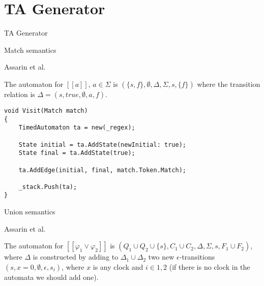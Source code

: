 
\section{TA Generator}
\begin{frame}[shrink=5]{TA Generator}
    \begin{center}
        
    \end{center}
\end{frame}
\begin{frame}[fragile]{Match semantics}
    \begin{definition}
        Assarin et al.
        
        The automaton for \underline{$[\![a]\!]$}, $a\in\Sigma$ is $(\{s,f\},\emptyset,\Delta,\Sigma,s,\{f\})$ where the transition relation is $\Delta={(s,true,\emptyset,a,f)}$.
    \end{definition}
        
    \begin{lstlisting}[style=csharp,basicstyle=\small]
void Visit(Match match)
{
    TimedAutomaton ta = new(_regex);
    
    State initial = ta.AddState(newInitial: true);
    State final = ta.AddState(true);

    ta.AddEdge(initial, final, match.Token.Match);

    _stack.Push(ta);
}
    \end{lstlisting}
\end{frame}

\begin{frame}{Union semantics}
    \begin{definition}
        
        Assarin et al.
        
        The automaton for $[[\varphi_1\vee\varphi_2]]$ is $(Q_1\cup Q_2 \cup \{s\},C_1\cup C_2,\Delta,\Sigma,s,F_1\cup F_2)$, where $\Delta$ is constructed
        by adding to $\Delta_1\cup \Delta_2$ two new $\epsilon$-transitions $(s, x = 0,\emptyset,\epsilon,s_i)$, where $x$ is any clock and $i\in{1,2}$
        (if there is no clock in the automata we should add one).
    \end{definition}

    \begin{columns}
        \begin{column}{0.5\textwidth}
            
        \end{column}
        \begin{column}{0.5\textwidth}
            
        \end{column}
    \end{columns}
\end{frame}


